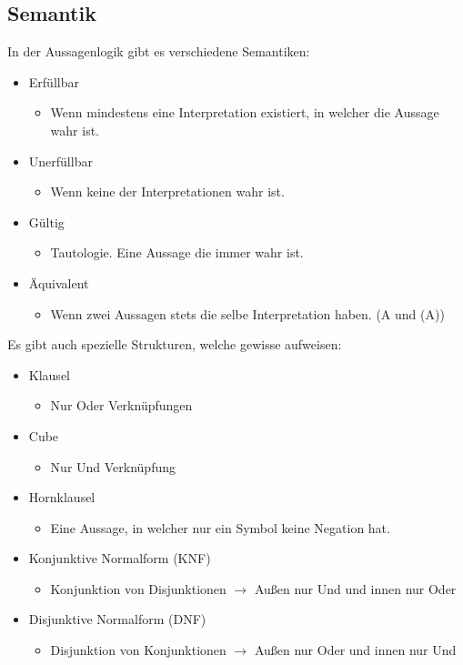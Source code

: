 \documentclass{article}
\begin{document}
		\subsection{Semantik}
		In der Aussagenlogik gibt es verschiedene Semantiken:
		\begin{itemize}
			\item{Erfüllbar}
			\begin{itemize}
				\item{Wenn mindestens eine Interpretation existiert, in welcher die Aussage wahr ist.}
			\end{itemize}
			\item{Unerfüllbar}
			\begin{itemize}
				\item{Wenn keine der Interpretationen wahr ist.}
			\end{itemize}
			\item{Gültig}
			\begin{itemize}
				\item{Tautologie. Eine Aussage die immer wahr ist.}
			\end{itemize}
			\item{Äquivalent}
			\begin{itemize}
				\item{Wenn zwei Aussagen stets die selbe Interpretation haben. (A und \neg(\neg A))}
			\end{itemize}
		\end{itemize}
		Es gibt auch spezielle Strukturen, welche gewisse aufweisen:
		\begin{itemize}
			\item{Klausel}
			\begin{itemize}
				\item{Nur Oder Verknüpfungen}
			\end{itemize}
			\item{Cube}
			\begin{itemize}
				\item{Nur Und Verknüpfung}
			\end{itemize}
			\item{Hornklausel}
			\begin{itemize}
				\item{Eine Aussage, in welcher nur ein Symbol keine Negation hat.}
			\end{itemize}
			\item{Konjunktive Normalform (KNF)}
			\begin{itemize}
				\item{Konjunktion von Disjunktionen $\to$ Außen nur Und und innen nur Oder}
			\end{itemize}
			\item{Disjunktive Normalform (DNF)}
			\begin{itemize}
				\item{Disjunktion von Konjunktionen $\to$ Außen nur Oder und innen nur Und}
			\end{itemize}
		\end{itemize}
\end{document}
